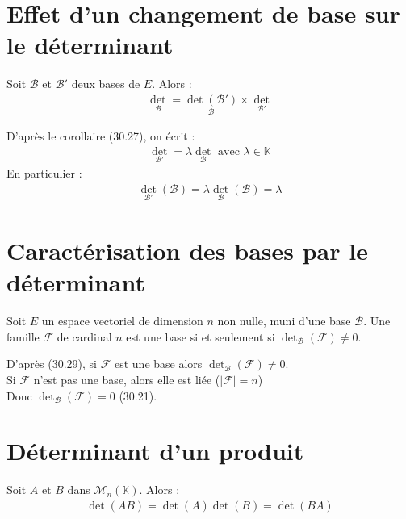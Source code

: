 \documentclass[../main.tex]{subfiles}
\begin{document}
\section{Effet d'un changement de base sur le déterminant}
\begin{tcolorbox}[title=Propostion 30.28, title filled=false, colframe=lightblue, colback=lightblue!10!white]
    Soit $\mathcal{B}$ et $\mathcal{B}'$ deux bases de $E$. Alors : 
    \begin{align*}
        \underset{\mathcal{B}}{\operatorname{det}} = \underset{\mathcal{B}}{\operatorname{det} (\mathcal{B}')} \times  \underset{\mathcal{B}'}{\operatorname{det}} 
    \end{align*}
\end{tcolorbox}

\noindent D'après le corollaire (30.27), on écrit : 
\begin{align*}
    \underset{\mathcal{B}'}{\operatorname{det}} = \lambda \underset{\mathcal{B}}{\operatorname{det}} \text{ avec } \lambda\in \mathbb{K}
\end{align*}
En particulier : 
\begin{align*}
    \operatorname{det}_{\mathcal{B}'}(\mathcal{B}) = \lambda \operatorname{det}_{\mathcal{B}}(\mathcal{B}) = \lambda
\end{align*}

\section{Caractérisation des bases par le déterminant}
\begin{tcolorbox}[title=Propostion 30.30, title filled=false, colframe=lightblue, colback=lightblue!10!white]
    Soit $E$ un espace vectoriel de dimension $n$ non nulle, muni d'une base $\mathcal{B}$. Une famille $\mathcal{F}$ de cardinal $n$ est une base si et seulement si $\operatorname{det}_\mathcal{B}(\mathcal{F})\neq 0$. 
\end{tcolorbox}

\noindent D'après (30.29), si $\mathcal{F}$ est une base alors $\operatorname{det}_\mathcal{B}(\mathcal{F})\neq 0$. \\
Si $\mathcal{F}$ n'est pas une base, alors elle est liée ($|\mathcal{F}| = n$) \\
Donc $\operatorname{det}_\mathcal{B}(\mathcal{F}) = 0$ (30.21). 

\section{Déterminant d'un produit}
\begin{tcolorbox}[title=Théorème 30.36, title filled=false, colframe=orange, colback=orange!10!white]
    Soit $A$ et $B$ dans $\mathcal{M}_n(\mathbb{K})$. Alors : 
    \begin{align*}
        \operatorname{det}(AB) = \operatorname{det}(A) \operatorname{det}(B) = \operatorname{det}(BA)
    \end{align*}
\end{tcolorbox}
\end{document}
